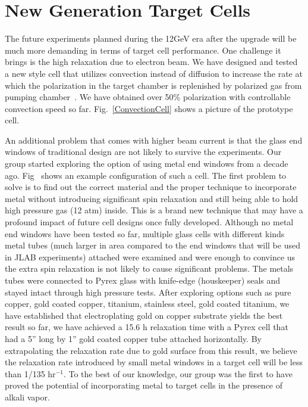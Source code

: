 \section{New Generation Target Cells}

The future experiments planned during the 12GeV era after the upgrade will be much more demanding in terms of target cell performance. One challenge it brings is the high relaxation due to electron beam. We have designed and tested a new style cell that utilizes convection instead of diffusion to increase the rate at which the polarization in the target chamber is replenished by polarized gas from pumping chamber~\cite{PhysRevC.84.065201}. We have obtained over 50\% polarization with controllable convection speed so far. Fig.~\ref{ConvectionCell} shows a picture of the prototype cell.

An additional problem that comes with higher beam current is that the glass end windows of traditional design are not likely to survive the experiments. Our group started exploring the option of using metal end windows from a decade ago. Fig~\cite{metal_end_windows} shows an example configuration of such a cell. The first problem to solve is to find out the correct material and the proper technique to incorporate metal without introducing significant spin relaxation and still being able to hold high pressure gas (12 atm) inside. This is a brand new technique that may have a profound impact of future cell designs once fully developed. Although no metal end windows have been tested so far, multiple glass cells with different kinds metal tubes (much larger in area compared to the end windows that will be used in JLAB experiments) attached were examined and were enough to convince us the extra spin relaxation is not likely to cause significant problems. The metals tubes were connected to Pyrex glass with knife-edge (houskeeper) seals and stayed intact through high pressure tests. After exploring options such as pure copper, gold coated copper, titanium, stainless steel, gold coated titanium, we have established that electroplating gold on copper substrate yields the best result so far, we have achieved a 15.6 h relaxation time with a Pyrex cell that had a 5'' long by 1'' gold coated copper tube attached horizontally. By extrapolating the relaxation rate due to gold surface from this result, we believe the relaxation rate introduced by small metal windows in a target cell will be less than 1/135 hr$^{-1}$. To the best of our knowledge, our group was the first to have proved the potential of incorporating metal to target cells in the presence of alkali vapor. 

